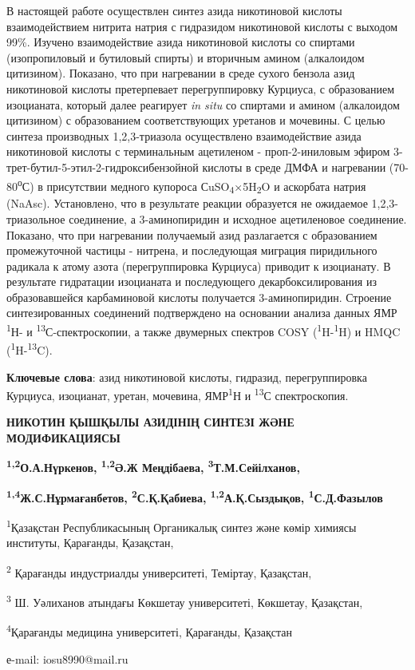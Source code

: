 В настоящей работе осуществлен синтез азида никотиновой кислоты
взаимодействием нитрита натрия с гидразидом никотиновой кислоты с
выходом 99\%. Изучено взаимодействие азида никотиновой кислоты со
спиртами (изопропиловый и бутиловый спирты) и вторичным амином
(алкалоидом цитизином). Показано, что при нагревании в среде сухого
бензола азид никотиновой кислоты претерпевает перегруппировку Курциуса,
с образованием изоцианата, который далее реагирует \emph{in situ} со
спиртами и амином (алкалоидом цитизином) с образованием соответствующих
уретанов и мочевины. С целью синтеза производных 1,2,3-триазола
осуществлено взаимодействие азида никотиновой кислоты с терминальным
ацетиленом - проп-2-иниловым эфиром
3-трет-бутил-5-этил-2-гидроксибензойной кислоты в среде ДМФА и
нагревании (70-80\textsuperscript{о}С) в присутствии медного купороса
СuSO\textsubscript{4}×5H\textsubscript{2}O и аскорбата натрия (NaAsc).
Установлено, что в результате реакции образуется не ожидаемое
1,2,3-триазольное соединение, а 3-аминопиридин и исходное ацетиленовое
соединение. Показано, что при нагревании получаемый азид разлагается с
образованием промежуточной частицы - нитрена, и последующая миграция
пиридильного радикала к атому азота (перегруппировка Курциуса) приводит
к изоцианату. В результате гидратации изоцианата и последующего
декарбоксилирования из образовавшейся карбаминовой кислоты получается
3-аминопиридин. Строение синтезированных соединений подтверждено на
основании анализа данных ЯМР \textsuperscript{1}Н- и
\textsuperscript{13}С-спектроскопии, а также двумерных спектров COSY
(\textsuperscript{1}H-\textsuperscript{1}H) и HMQC
(\textsuperscript{1}H-\textsuperscript{13}C).

{\bfseries Ключевые слова}: азид никотиновой кислоты, гидразид,
перегруппировка Курциуса, изоцианат, уретан, мочевина,
ЯМР\textsuperscript{1}Н и \textsuperscript{13}С спектроскопия.

\begin{center}
{\large\bfseries НИКОТИН ҚЫШҚЫЛЫ АЗИДІНІҢ СИНТЕЗІ ЖӘНЕ МОДИФИКАЦИЯСЫ}

{\bfseries \textsuperscript{1,2}О.А.Нүркенов, \textsuperscript{1,2}Ә.Ж
Меңдібаева, \textsuperscript{3}Т.М.Сейілханов,}

{\bfseries \textsuperscript{1,4}Ж.С.Нұрмағанбетов,
\textsuperscript{2}С.Қ.Қабиева, \textsuperscript{1,2}А.Қ.Сыздықов,
\textsuperscript{1}С.Д.Фазылов}

\textsuperscript{1}Қазақстан Республикасының Органикалық синтез және
көмір химиясы институты, Қарағанды, Қазақстан,

\textsuperscript{2} Қарағанды индустриалды университеті, Теміртау,
Қазақстан,

\textsuperscript{3} Ш. Уәлиханов атындағы Көкшетау университеті,
Көкшетау, Қазақстан,

\textsuperscript{4}Қарағанды медицина университеті, Қарағанды, Қазақстан

е-mail: iosu8990@mail.ru
\end{center}

